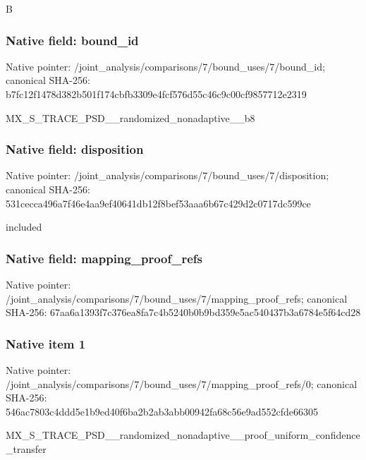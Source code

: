 \documentclass[10pt,a4paper]{article}
\begin{document}
\begingroup\raggedright\sloppy B\par\endgroup

\subsubsection{Native field: bound\_\allowbreak{}id}
Native pointer: /joint\_\allowbreak{}analysis/comparisons/7/bound\_\allowbreak{}uses/7/bound\_\allowbreak{}id; canonical SHA-256: b7fc12f1478d382b501f174cbfb3309e4fcf576d55c46c9c00cf9857712e2319

\begingroup\raggedright\sloppy MX\_\allowbreak{}S\_\allowbreak{}TRACE\_\allowbreak{}PSD\_\allowbreak{}\_\allowbreak{}randomized\_\allowbreak{}nonadaptive\_\allowbreak{}\_\allowbreak{}b8\par\endgroup

\subsubsection{Native field: disposition}
Native pointer: /joint\_\allowbreak{}analysis/comparisons/7/bound\_\allowbreak{}uses/7/disposition; canonical SHA-256: 531cecca496a7f46e4aa9ef40641db12f8bef53aaa6b67c429d2c0717dc599ce

\begingroup\raggedright\sloppy included\par\endgroup

\subsubsection{Native field: mapping\_\allowbreak{}proof\_\allowbreak{}refs}
Native pointer: /joint\_\allowbreak{}analysis/comparisons/7/bound\_\allowbreak{}uses/7/mapping\_\allowbreak{}proof\_\allowbreak{}refs; canonical SHA-256: 67aa6a1393f7c376ea8fa7c4b5240b0b9bd359e5ac540437b3a6784e5f64cd28

\subsubsection{Native item 1}
Native pointer: /joint\_\allowbreak{}analysis/comparisons/7/bound\_\allowbreak{}uses/7/mapping\_\allowbreak{}proof\_\allowbreak{}refs/0; canonical SHA-256: 546ac7803c4ddd5e1b9ed40f6ba2b2ab3abb00942fa68c56e9ad552cfde66305

\begingroup\raggedright\sloppy MX\_\allowbreak{}S\_\allowbreak{}TRACE\_\allowbreak{}PSD\_\allowbreak{}\_\allowbreak{}randomized\_\allowbreak{}nonadaptive\_\allowbreak{}\_\allowbreak{}proof\_\allowbreak{}uniform\_\allowbreak{}confidence\_\allowbreak{}transfer\par\endgroup
\end{document}
